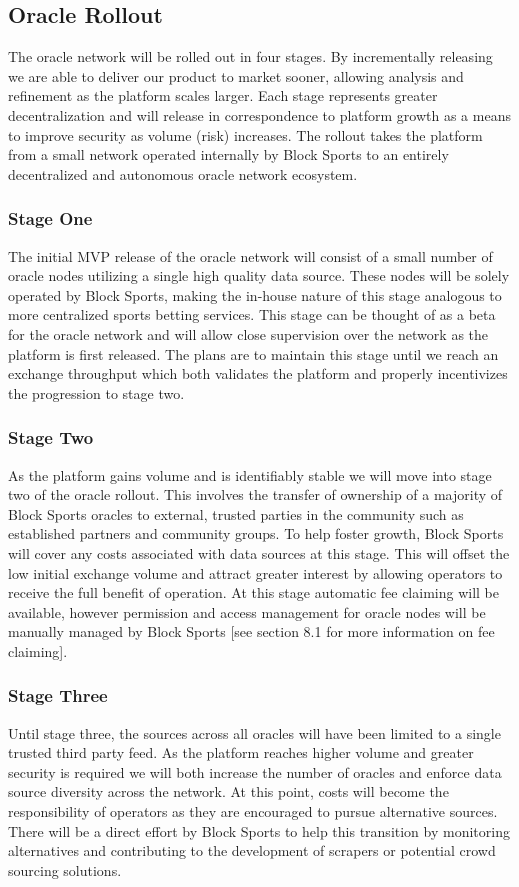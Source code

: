 \documentclass{article}
\begin{document}
	\subsection{Oracle Rollout}
The oracle network will be rolled out in four stages. By incrementally releasing we are able to deliver our product to market sooner, allowing analysis and refinement as the platform scales larger. Each stage represents greater decentralization and will release in correspondence to platform growth as a means to improve security as volume (risk) increases. The rollout takes the platform from a small network operated internally by Block Sports to an entirely decentralized and autonomous oracle network ecosystem.

		\subsubsection{Stage One}
		The initial MVP release of the oracle network will consist of a small number of oracle nodes utilizing a single high quality data source. These nodes will be solely operated by Block Sports, making the in-house nature of this stage analogous to more centralized sports betting services. This stage can be thought of as a beta for the oracle network and will allow close supervision over the network as the platform is first released. The plans are to maintain this stage until we reach an exchange throughput which both validates the platform and properly incentivizes the progression to stage two.

		\subsubsection{Stage Two}
		As the platform gains volume and is identifiably stable we will move into stage two of the oracle rollout. This involves the transfer of ownership of a majority of Block Sports oracles to external, trusted parties in the community such as established partners and community groups. To help foster growth, Block Sports will cover any costs associated with data sources at this stage. This will offset the low initial exchange volume and attract greater interest by allowing operators to receive the full benefit of operation. At this stage automatic fee claiming will be available, however permission and access management for oracle nodes will be manually managed by Block Sports [see section 8.1 for more information on fee claiming].

		\subsubsection{Stage Three}
		Until stage three, the sources across all oracles will have been limited to a single trusted third party feed. As the platform reaches higher volume and greater security is required we will both increase the number of oracles and enforce data source diversity across the network. At this point, costs will become the responsibility of operators as they are encouraged to pursue alternative sources. There will be a direct effort by Block Sports to help this transition by monitoring alternatives and contributing to the development of scrapers or potential crowd sourcing solutions.
\end{document}
